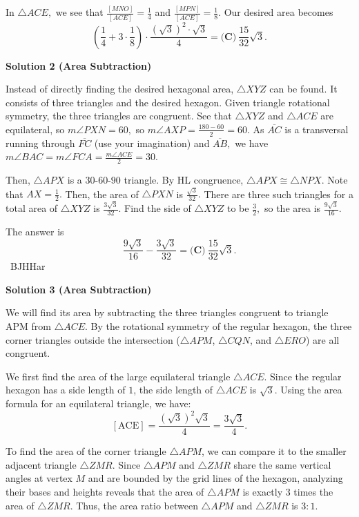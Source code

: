 \begin{enumerate}
 In $\triangle ACE,$ we see that $\frac{[MNO]}{[ACE]} = \frac{1}{4}$ and $\frac{[MPN]}{[ACE]} = \frac{1}{8}.$ Our desired area becomes 
 \[\left(\frac{1}{4}+3 \cdot \frac{1}{8}\right) \cdot \frac{(\sqrt{3})^2 \cdot \sqrt{3}}{4} = \boxed{\textbf{(C)}\ \frac {15}{32}\sqrt{3}}.\]




\textbf{Solution 2 (Area Subtraction)}

Instead of directly finding the desired hexagonal area, $\triangle XYZ$ can be found. It consists of three triangles and the desired hexagon. Given triangle rotational symmetry, the three triangles are congruent. See that $\triangle XYZ$ and $\triangle ACE$ are equilateral, so $m\angle PXN=60,$ so $m\angle AXP = \frac{180-60}{2}=60.$ As $\overline {AC}$ is a transversal running through $\overline {FC}$ (use your imagination) and $\overline {AB},$ we have $m\angle BAC=m\angle FCA = \frac{m\angle ACE}{2}=30.$ 

 Then, $\triangle APX$ is a $30$-$60$-$90$ triangle. By HL congruence, $\triangle APX \cong \triangle NPX.$ Note that $AX=\frac{1}{2}.$ Then, the area of $\triangle PXN$ is $\frac{\sqrt{3}}{32}.$ There are three such triangles for a total area of $\triangle XYZ$ is $\frac{3\sqrt{3}}{32}.$ Find the side of $\triangle XYZ$ to be $\frac{3}{2},$ so the area is $\frac{9\sqrt{3}}{16}.$ 

 The answer is 
 \[\frac{9\sqrt{3}}{16}-\frac{3\sqrt{3}}{32}=\boxed{\textbf{(C)}\ \frac {15}{32}\sqrt{3}}.\]~BJHHar

 



\textbf{Solution 3 (Area Subtraction)}

We will find its area by subtracting the three triangles congruent to triangle APM from $\triangle ACE$. By the rotational symmetry of the regular hexagon, the three corner triangles outside the intersection ($\triangle APM$, $\triangle CQN$, and $\triangle ERO$) are all congruent. 

 We first find the area of the large equilateral triangle $\triangle ACE$. Since the regular hexagon has a side length of $1$, the side length of $\triangle ACE$ is $\sqrt{3}.$ Using the area formula for an equilateral triangle, we have:
 \[[\text{ACE}] = \frac{(\sqrt{3})^2\sqrt{3}}{4} = \frac{3\sqrt{3}}{4}.\]

 To find the area of the corner triangle $\triangle APM$, we can compare it to the smaller adjacent triangle $\triangle ZMR.$ Since $\triangle APM$ and $\triangle ZMR$ share the same vertical angles at vertex $M$ and are bounded by the grid lines of the hexagon, analyzing their bases and heights reveals that the area of $\triangle APM$ is exactly $3$ times the area of $\triangle ZMR.$ Thus, the area ratio between $\triangle APM$ and $\triangle ZMR$ is $3:1.$ 


\end{enumerate}
